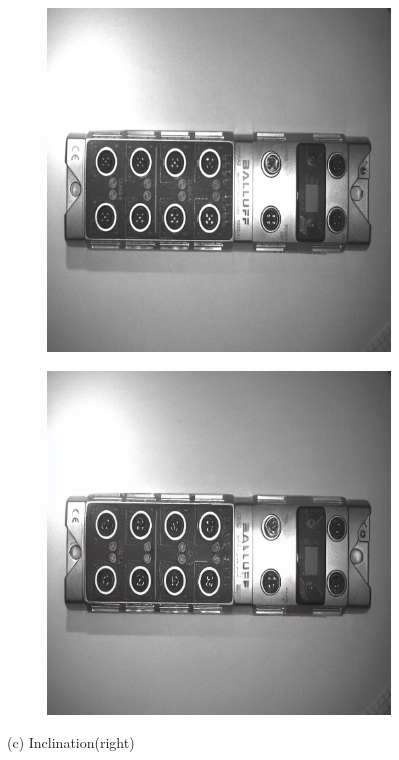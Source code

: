 \documentclass[12pt,DIV14,BCOR12mm,a4paper,footinclude=false,headinclude,parskip=half-,twoside,openright,cleardoublepage=empty,toc=index,bibliography=totoc,listof=totoc]{scrreprt}
\numberwithin{equation}{chapter}
\begin{document}
\begin{figure}
    \vspace{0.3cm} %

    \begin{subfigure}[t]{0.24\textwidth}
        \centering
        \includegraphics[width=\textwidth]{../media/diff_bni_right_real.png}
    \end{subfigure}%
    \hspace{0.02\textwidth}
    \begin{subfigure}[t]{0.24\textwidth}
        \centering
        \includegraphics[width=\textwidth]{../media/diff_bni_right_fake.png}
    \end{subfigure}
    \caption*{(c) Inclination(right)}


\end{figure}
\end{document}
